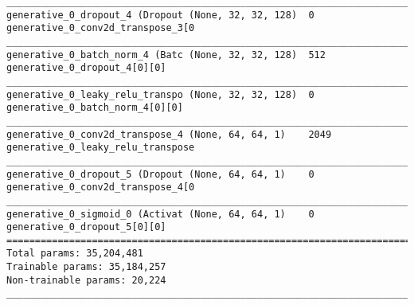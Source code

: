 \begin{lstlisting}[caption={dSprites-\ac{VLAE} Decoder},captionpos=b,basicstyle=\tiny, label={lst:dsprites-vlae-decoder}]
__________________________________________________________________________________________________
generative_0_dropout_4 (Dropout (None, 32, 32, 128)  0           generative_0_conv2d_transpose_3[0
__________________________________________________________________________________________________
generative_0_batch_norm_4 (Batc (None, 32, 32, 128)  512         generative_0_dropout_4[0][0]
__________________________________________________________________________________________________
generative_0_leaky_relu_transpo (None, 32, 32, 128)  0           generative_0_batch_norm_4[0][0]
__________________________________________________________________________________________________
generative_0_conv2d_transpose_4 (None, 64, 64, 1)    2049        generative_0_leaky_relu_transpose
__________________________________________________________________________________________________
generative_0_dropout_5 (Dropout (None, 64, 64, 1)    0           generative_0_conv2d_transpose_4[0
__________________________________________________________________________________________________
generative_0_sigmoid_0 (Activat (None, 64, 64, 1)    0           generative_0_dropout_5[0][0]
==================================================================================================
Total params: 35,204,481
Trainable params: 35,184,257
Non-trainable params: 20,224
__________________________________________________________________________________________________
\end{lstlisting}